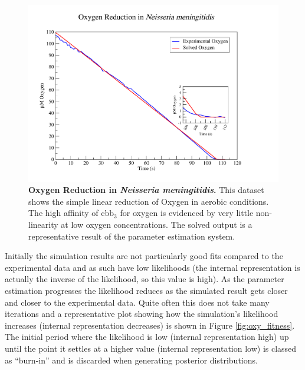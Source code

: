 \begin{figure}[p]
 \centering
 \includegraphics[width=14cm, trim=2cm 1cm 4cm 1cm]{./05-oxygenreduction/data/o2sim.pdf}
 \caption[{Oxygen Reduction in \textit{Neisseria meningitidis}.}]{{\bf Oxygen Reduction in \textit{Neisseria meningitidis}.} This dataset shows the simple linear reduction of Oxygen in aerobic conditions. The high affinity of $\mathrm{cbb}_3$ for oxygen is evidenced by very little non-linearity at low oxygen concentrations. The solved output is a representative result of the parameter estimation system.
 \label{fig:o2sim}}
\end{figure}
\afterpage{\clearpage}


Initially the simulation results are not particularly good fits compared to the experimental data and as such have low likelihoods (the internal representation is actually the inverse of the likelihood, so this value is high). As the parameter estimation progresses the likelihood reduces as the simulated result gets closer and closer to the experimental data. Quite often this does not take many iterations and a representative plot showing how the simulation's likelihood increases (internal representation decreases) is shown in Figure \ref{fig:oxy_fitness}. The initial period where the likelihood is low (internal representation high) up until the point it settles at a higher value (internal representation low) is classed as ``burn-in'' and is discarded when generating posterior distributions.


